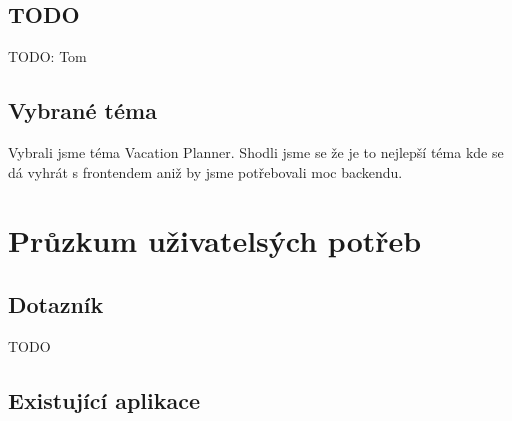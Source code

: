 \documentclass{article}
\begin{document}
\subsection{TODO}
TODO: Tom

\subsection{Vybrané téma}
Vybrali jsme téma Vacation Planner. Shodli jsme se že je to nejlepší téma kde
se dá vyhrát s frontendem aniž by jsme potřebovali moc backendu.

\section{Průzkum uživatelsých potřeb}

\subsection{Dotazník}

TODO

\subsection{Existující aplikace}
\end{document}
